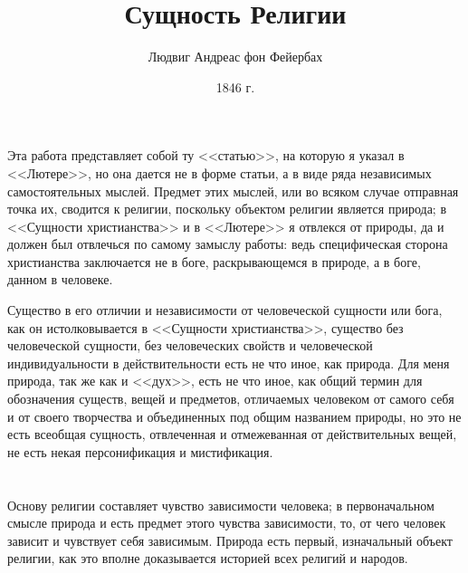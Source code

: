 \documentclass[12pt,oneside]{book}
\title{Сущность Религии}
\author{Людвиг Андреас фон Фейербах}
\date{1846 г.}
\begin{document}
\maketitle

\tableofcontents

\chapter{}

Эта работа представляет собой ту <<статью>>, на которую я указал в <<Лютере>>, но она дается не в форме статьи, а в виде ряда независимых самостоятельных мыслей. Предмет этих мыслей, или во всяком случае отправная точка их, сводится к религии, поскольку объектом религии является природа; в <<Сущности христианства>> и в <<Лютере>> я отвлекся от природы, да и должен был отвлечься по самому замыслу работы: ведь специфическая сторона христианства заключается не в боге, раскрывающемся в природе, а в боге, данном в человеке.

Существо в его отличии и независимости от человеческой сущности или бога, как он истолковывается в <<Сущности христианства>>, существо без человеческой сущности, без человеческих свойств и человеческой индивидуальности в действительности есть не что иное, как природа. Для меня природа, так же как и <<дух>>, есть не что иное, как общий термин для обозначения существ, вещей и предметов, отличаемых человеком от самого себя и от своего творчества и объединенных под общим названием природы, но это не есть всеобщая сущность, отвлеченная и отмежеванная от действительных вещей, не есть некая персонификация и мистификация.

\chapter{}

Основу религии составляет чувство зависимости человека; в первоначальном смысле природа и есть предмет этого чувства зависимости, то, от чего человек зависит и чувствует себя зависимым. Природа есть первый, изначальный объект религии, как это вполне доказывается историей всех религий и народов.



\chapter{}
\end{document}
